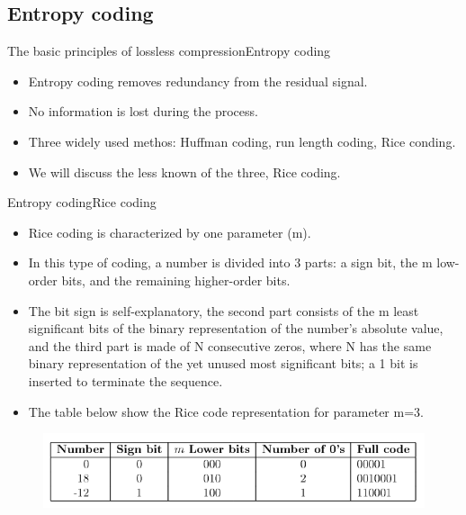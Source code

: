 \documentclass{beamer}
\begin{document}
\subsection{Entropy coding}
\begin{frame}{The basic principles of lossless compression}{Entropy coding}
	\begin{itemize}[<+->]
		\item{
			Entropy coding removes redundancy from the residual signal.
		}
		\item{
			No information is lost during the process.
		}
		\item{
			Three widely used methos: Huffman coding, run length coding, Rice conding.
		}
		\item{
			We will discuss the less known of the three, Rice coding.
		}
	\end{itemize}
\end{frame}
\begin{frame}{Entropy coding}{Rice coding}
	\begin{itemize}
		\item{
			Rice coding is characterized by one parameter (m).
		}
		\item{
			In this type of coding, a number is divided into 3 parts: a sign bit, the m low-order bits, and the remaining higher-order bits.
		}
		\item{
			The bit sign is self-explanatory, the second part consists of the m least significant bits of the binary representation of the number's absolute value, and the third part is made of N consecutive zeros, where N has the same binary representation of the yet unused most significant bits; a 1 bit is inserted to terminate the sequence.
		}
		\item{
			The table below show the Rice code representation for parameter m=3.
		}
	\end{itemize}
	\begin{figure}
		\includegraphics[scale=0.42]{rice_coding.png}
	\end{figure}  
\end{frame}
\end{document}
